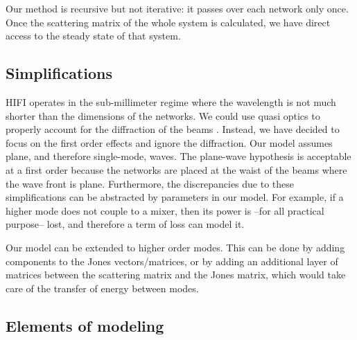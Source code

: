 \documentclass[a4paper,11pt]{article}
\begin{document}
Our method is recursive but not iterative: it passes over each network only once.
Once the scattering matrix of the whole system is calculated, we have direct access to the steady state of that system.




\subsection{Simplifications}

HIFI operates in the sub-millimeter regime where the wavelength is not much shorter than the dimensions of the networks.
We could use quasi optics to properly account for the diffraction of the beams \cite{goldsmith1998quasioptical}.
Instead, we have decided to focus on the first order effects and ignore the diffraction.
Our model assumes plane, and therefore single-mode, waves.
The plane-wave hypothesis is acceptable at a first order because the networks are placed at the waist of the beams where the wave front is plane.
Furthermore, the discrepancies due to these simplifications can be abstracted by parameters in our model.
For example, if a higher mode does not couple to a mixer, then its power is --for all practical purpose-- lost, and therefore a term of loss can model it.

Our model can be extended to higher order modes.
This can be done by adding components to the Jones vectors/matrices, or by adding an additional layer of matrices between the scattering matrix and the Jones matrix, which would take care of the transfer of energy between modes.




\subsection{Elements of modeling}
\end{document}
